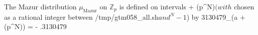 The Mazur distribution $\mu_{\text{Mazur}}$ on $\mathbb{Z}_p$ is defined on intervals  + (p^N)$ (with $ chosen as a rational integer between /tmp/gtm058_all.sh$ and ^N-1$) by
3130479\mu_{}(a + (p^N)) =  - .3130479
